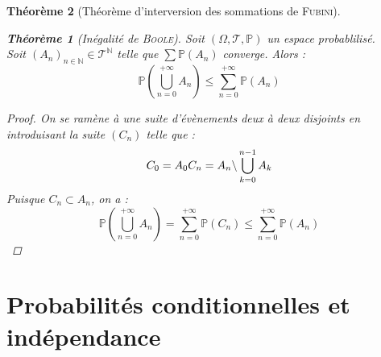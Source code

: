 \documentclass[11pt,a4paper]{report}
\newtheorem{theorem}{Théorème}[chapter]
\newtheorem{itheorem}[theorem]{Théorème}
\theoremstyle{definition}
\begin{document}
\begin{theorem}[Théorème d'interversion des sommations de \textsc{Fubini}]
{{\begin{itheorem}[Inégalité de \textsc{Boole}]
Soit $(\Omega, \mathscr{T},\mathbb{P})$ un espace probablilisé. \\
Soit $(A_n)_{n\in\mathbb{N}} \in \mathscr{T}^\mathbb{N}$ telle que $\sum \mathbb{P}(A_n)$ converge. Alors :
     \begin{equation}
     \mathbb{P}\left( \bigcup_{n=0}^{+\infty} A_n \right) \le \sum_{n=0}^{+\infty} \mathbb{P}(A_n)
     \end{equation}
\end{itheorem}
\begin{proof}
     On se ramène à une suite d'évènements deux à deux disjoints en introduisant la suite $(C_n)$ telle que :
     \begin{equation*}
          C_0 = A_0 \\ C_n = A_n \backslash \bigcup_{k=0}^{n-1}A_k
     \end{equation*}
     Puisque $C_n \subset A_n$, on a : 
     \begin{equation*}
          \mathbb{P} \left( \bigcup_{n=0}^{+\infty} A_n \right) = \sum_{n=0}^{+\infty} \mathbb{P}(C_n) \le \sum_{n=0}^{+\infty} \mathbb{P}(A_n)
     \end{equation*}
\end{proof}

\section{Probabilités conditionnelles et indépendance} %
\label{sec:independance}
}}
\end{theorem}
\end{document}

